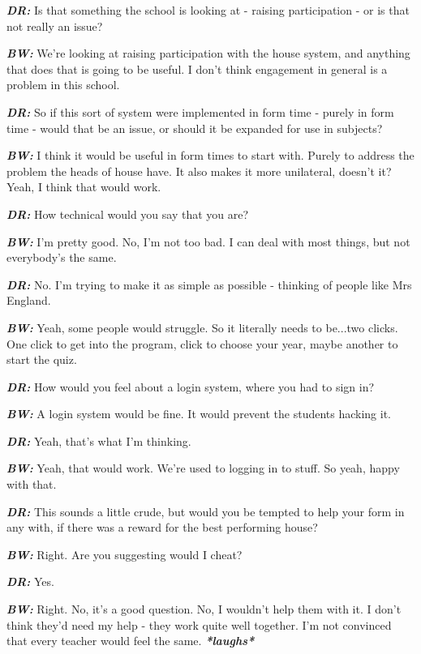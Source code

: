 \textit{\textbf{DR:}} Is that something the school is looking at - raising participation - or is that not really an issue?

\textit{\textbf{BW:}} We're looking at raising participation with the house system, and anything that does that is going to be useful. I don't think engagement in general is a problem in this school.

\textit{\textbf{DR:}} So if this sort of system were implemented in form time - purely in form time - would that be an issue, or should it be expanded for use in subjects?

\textit{\textbf{BW:}} I think it would be useful in form times to start with. Purely to address the problem the heads of house have. It also makes it more unilateral, doesn't it? Yeah, I think that would work.

\textit{\textbf{DR:}} How technical would you say that you are?

\textit{\textbf{BW:}} I'm pretty good. No, I'm not too bad. I can deal with most things, but not everybody's the same.

\textit{\textbf{DR:}} No. I'm trying to make it as simple as possible - thinking of people like Mrs England.

\textit{\textbf{BW:}} Yeah, some people would struggle. So it literally needs to be...two clicks. One click to get into the program, click to choose your year, maybe another to start the quiz.

\textit{\textbf{DR:}} How would you feel about a login system, where you had to sign in?

\textit{\textbf{BW:}} A login system would be fine. It would prevent the students hacking it.

\textit{\textbf{DR:}} Yeah, that's what I'm thinking.

\textit{\textbf{BW:}} Yeah, that would work. We're used to logging in to stuff. So yeah, happy with that.

\textit{\textbf{DR:}} This sounds a little crude, but would you be tempted to help your form in any with, if there was a reward for the best performing house?

\textit{\textbf{BW:}} Right. Are you suggesting would I cheat?

\textit{\textbf{DR:}} Yes.

\textit{\textbf{BW:}} Right. No, it's a good question. No, I wouldn't help them with it. I don't think they'd need my help - they work quite well together. I'm not convinced that every teacher would feel the same. \textit{\textbf{*laughs*}}

